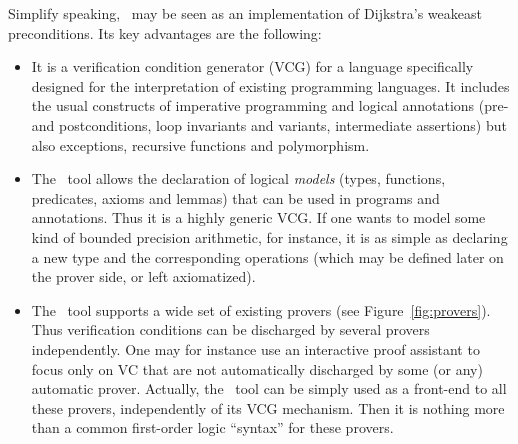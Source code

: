\documentclass[a4paper,12pt]{report}
\begin{document}
Simplify speaking, \why\ may be seen as an implementation
of Dijkstra's weakeast preconditions. Its key advantages are the
following: 
\begin{itemize}
\item 
  It is a verification condition generator (VCG) for a language
  specifically designed for the interpretation of existing programming
  languages. It includes the usual constructs of imperative
  programming and logical annotations (pre- and postconditions, loop
  invariants and variants, intermediate assertions) but also
  exceptions, recursive functions and polymorphism.

\item 
  The \why\ tool allows the declaration of logical \emph{models}
  (types, functions, predicates, axioms and lemmas) that can be used in
  programs and annotations. Thus it is a highly generic VCG.  If one
  wants to model some kind of bounded precision arithmetic, for
  instance, it is as simple as declaring a new type and the
  corresponding operations (which may be defined later on the prover
  side, or left axiomatized).

\item
  The \why\ tool supports a wide set of existing provers
  (see Figure~\ref{fig:provers}). Thus verification conditions can be
  discharged by several provers independently. One may for instance
  use an interactive proof assistant to focus only on VC that are not
  automatically discharged by some (or any) automatic prover.
  Actually, the \why\ tool can be simply used as a front-end to all
  these provers, independently of its VCG mechanism. Then it is
  nothing more than a common first-order logic ``syntax'' for these
  provers. 

\end{itemize}
\end{document}
